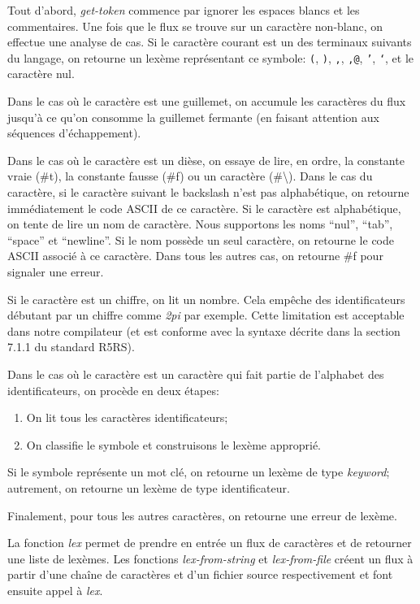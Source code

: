 \documentclass[11pt]{report}
\begin{document}
Tout d'abord, \emph{get-token} commence par ignorer les espaces blancs
et les commentaires.  Une fois que le flux se trouve sur un caractère
non-blanc, on effectue une analyse de cas.  Si le caractère courant
est un des terminaux suivants du langage, on retourne un lexème
représentant ce symbole: \texttt{(}, \texttt{)}, \texttt{,},
\texttt{,@}, \texttt{'}, \texttt{`}, et le caractère nul.

Dans le cas où le caractère est une guillemet, on accumule les
caractères du flux jusqu'à ce qu'on consomme la guillemet fermante (en
faisant attention aux séquences d'échappement).

Dans le cas où le caractère est un dièse, on essaye de lire, en ordre,
la constante vraie (\#t), la constante fausse (\#f) ou un caractère
(\#\textbackslash).  Dans le cas du caractère, si le caractère suivant
le backslash n'est pas alphabétique, on retourne immédiatement le code
ASCII de ce caractère.  Si le caractère est alphabétique, on tente de
lire un nom de caractère.  Nous supportons les noms ``nul'', ``tab'',
``space'' et ``newline''.  Si le nom possède un seul caractère, on
retourne le code ASCII associé à ce caractère.  Dans tous les autres
cas, on retourne \#f pour signaler une erreur.

Si le caractère est un chiffre, on lit un nombre.  Cela empêche des
identificateurs débutant par un chiffre comme \emph{2pi} par exemple.
Cette limitation est acceptable dans notre compilateur (et est
conforme avec la syntaxe décrite dans la section 7.1.1 du standard
R5RS).

Dans le cas où le caractère est un caractère qui fait partie de
l'alphabet des identificateurs, on procède en deux étapes:

\begin{enumerate}
\item On lit tous les caractères identificateurs;
\item On classifie le symbole et construisons le lexème approprié.
\end{enumerate}

Si le symbole représente un mot clé, on retourne un lexème de type
\emph{keyword}; autrement, on retourne un lexème de type
identificateur.

Finalement, pour tous les autres caractères, on retourne une erreur de
lexème.

La fonction \emph{lex} permet de prendre en entrée un flux de
caractères et de retourner une liste de lexèmes.  Les fonctions
\emph{lex-from-string} et \emph{lex-from-file} créent un flux à partir
d'une chaîne de caractères et d'un fichier source respectivement et
font ensuite appel à \emph{lex}.
\end{document}

